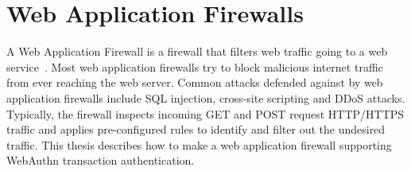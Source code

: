 
\section{Web Application Firewalls}

A Web Application Firewall is a firewall that filters web traffic going to a web service~\cite{web-application-firewall}. Most web application firewalls try to block malicious internet traffic from ever reaching the web server. Common attacks defended against by web application firewalls include SQL injection, cross-site scripting and DDoS attacks. Typically, the firewall inspects incoming GET and POST request HTTP/HTTPS traffic and applies pre-configured rules to identify and filter out the undesired traffic. This thesis describes how to make a web application firewall supporting WebAuthn transaction authentication.






